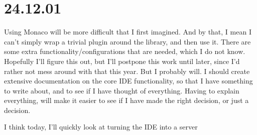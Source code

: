\section{24.12.01}

Using Monaco will be more difficult that I first imagined. And by that, I mean
I can't simply wrap a trivial plugin around the library, and then use it. There
are some extra functionality/configurations that are needed, which I do not
know. Hopefully I'll figure this out, but I'll postpone this work until later,
since I'd rather not mess around with that this year. But I probably will. I
should create extensive documentation on the core IDE functionality, so that I
have something to write about, and to see if I have thought of everything.
Having to explain everything, will make it easier to see if I have made the
right decision, or just a decision.

I think today, I'll quickly look at turning the IDE into a server
